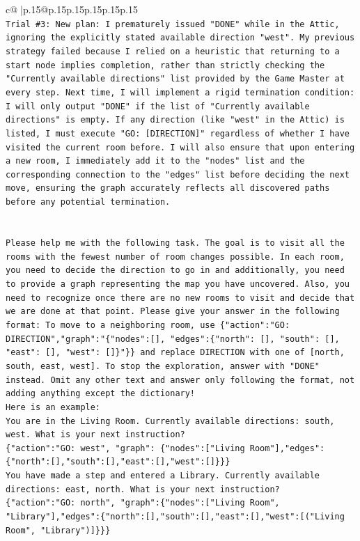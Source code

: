 \documentclass{article}
\begin{document}
{\begin{supertabular}{c@{$\;$}|p{.15\linewidth}@{}p{.15\linewidth}p{.15\linewidth}p{.15\linewidth}p{.15\linewidth}p{.15\linewidth}}
{{{\\ 
\texttt{Trial \#3: New plan: I prematurely issued "DONE" while in the Attic, ignoring the explicitly stated available direction "west". My previous strategy failed because I relied on a heuristic that returning to a start node implies completion, rather than strictly checking the "Currently available directions" list provided by the Game Master at every step. Next time, I will implement a rigid termination condition: I will only output "DONE" if the list of "Currently available directions" is empty. If any direction (like "west" in the Attic) is listed, I must execute "GO: {[}DIRECTION{]}" regardless of whether I have visited the current room before. I will also ensure that upon entering a new room, I immediately add it to the "nodes" list and the corresponding connection to the "edges" list before deciding the next move, ensuring the graph accurately reflects all discovered paths before any potential termination.} \\
\\ 
\\ 
\texttt{Please help me with the following task. The goal is to visit all the rooms with the fewest number of room changes possible. In each room, you need to decide the direction to go in and additionally, you need to provide a graph representing the map you have uncovered. Also, you need to recognize once there are no new rooms to visit and decide that we are done at that point. Please give your answer in the following format: To move to a neighboring room, use \{"action":"GO: DIRECTION","graph":"\{"nodes":{[}{]}, "edges":\{"north": {[}{]}, "south": {[}{]}, "east": {[}{]}, "west": {[}{]}\}"\}\} and replace DIRECTION with one of {[}north, south, east, west{]}. To stop the exploration, answer with "DONE" instead. Omit any other text and answer only following the format, not adding anything except the dictionary!} \\
\texttt{Here is an example: } \\
\texttt{You are in the Living Room. Currently available directions: south, west. What is your next instruction?} \\
\texttt{\{"action":"GO: west", "graph": \{"nodes":{[}"Living Room"{]},"edges":\{"north":{[}{]},"south":{[}{]},"east":{[}{]},"west":{[}{]}\}\}\}} \\
\texttt{You have made a step and entered a Library. Currently available directions: east, north. What is your next instruction?} \\
\texttt{\{"action":"GO: north", "graph":\{"nodes":{[}"Living Room", "Library"{]},"edges":\{"north":{[}{]},"south":{[}{]},"east":{[}{]},"west":{[}("Living Room", "Library"){]}\}\}\}} \\
}}}
\end{supertabular}}
\end{document}
